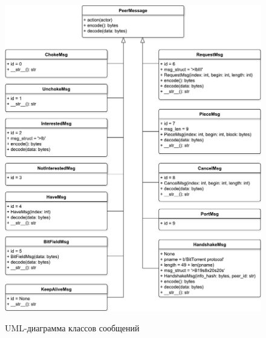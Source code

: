 \newpage

\begin{figure}[h!]
	\begin{center}
		{\includegraphics[scale = 0.57]{img/msgs.pdf}}
		\caption{UML-диаграмма классов сообщений}
		\label{fig301:image}
	\end{center}
\end{figure}

\newpage


